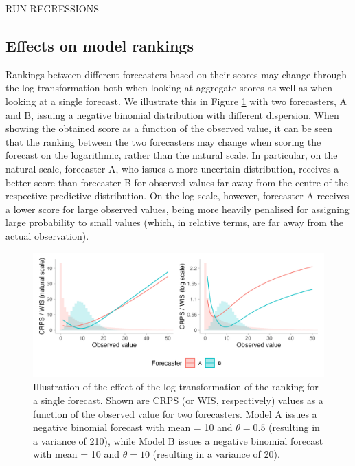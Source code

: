 \documentclass{article}
\begin{document}
RUN REGRESSIONS




\subsection{Effects on model rankings}
\label{sec:methods:rankings}
Rankings between different forecasters based on their scores may change through the log-transformation both when looking at aggregate scores as well as when looking at a single forecast. We illustrate this in Figure \ref{fig:illustration-ranking} with two forecasters, A and B, issuing a negative binomial distribution with different dispersion. When showing the obtained score as a function of the observed value, it can be seen that the ranking between the two forecasters may change when scoring the forecast on the logarithmic, rather than the natural scale. In particular, on the natural scale, forecaster A, who issues a more uncertain distribution, receives a better score than forecaster B for observed values far away from the centre of the respective predictive distribution. On the log scale, however, forecaster A receives a lower score for large observed values, being more heavily penalised for assigning large probability to small values (which, in relative terms, are far away from the actual observation). 


\begin{figure}[h!]
\centering
\includegraphics[width = 1\textwidth]{output/figures/illustration-effect-log-ranking-crps.png}
\caption{Illustration of the effect of the log-transformation of the ranking for a single forecast. Shown are CRPS (or WIS, respectively) values as a function of the observed value for two forecasters. Model A issues a negative binomial forecast with mean = 10 and $\theta = 0.5$ (resulting in a variance of 210), while Model B issues a negative binomial forecast with mean = 10 and $\theta = 10$ (resulting in a variance of 20).}
\label{fig:illustration-ranking}
\end{figure}
\end{document}

